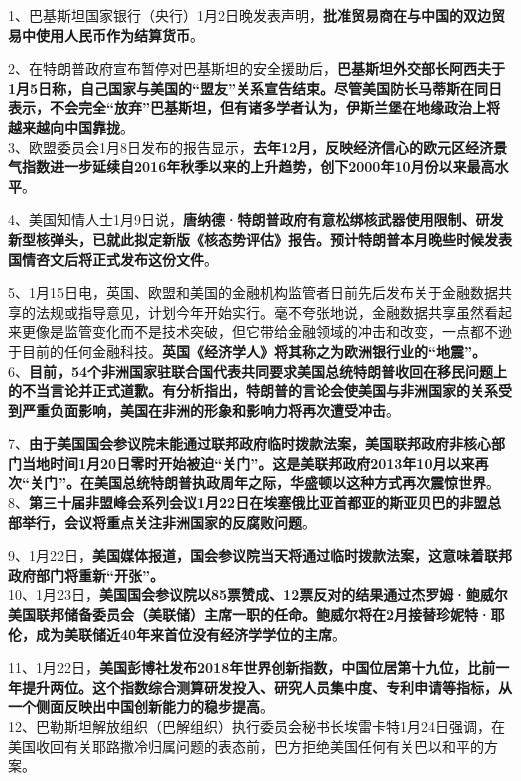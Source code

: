 1、巴基斯坦国家银行（央行）1月2日晚发表声明，{\textbf{批准贸易商在与中国的双边贸易中使用人民币作为结算货币}}。

2、在特朗普政府宣布暂停对巴基斯坦的安全援助后，{\textbf{巴基斯坦外交部长阿西夫于1月5日称，自己国家与美国的``盟友''关系宣告结束。尽管美国防长马蒂斯在同日表示，不会完全``放弃''巴基斯坦，但有诸多学者认为，伊斯兰堡在地缘政治上将越来越向中国靠拢}}。\\
3、欧盟委员会1月8日发布的报告显示，{\textbf{去年12月，反映经济信心的欧元区经济景气指数进一步延续自2016年秋季以来的上升趋势，创下2000年10月份以来最高水平}}。

4、美国知情人士1月9日说，{\textbf{唐纳德·特朗普政府有意松绑核武器使用限制、研发新型核弹头，已就此拟定新版《核态势评估》报告。预计特朗普本月晚些时候发表国情咨文后将正式发布这份文件}}。

5、1月15日电，英国、欧盟和美国的金融机构监管者日前先后发布关于金融数据共享的法规或指导意见，计划今年开始实行。毫不夸张地说，金融数据共享虽然看起来更像是监管变化而不是技术突破，但它带给金融领域的冲击和改变，一点都不逊于目前的任何金融科技。{\textbf{英国《经济学人》将其称之为欧洲银行业的``地震''。}}\\
6、{\textbf{目前，54个非洲国家驻联合国代表共同要求美国总统特朗普收回在移民问题上的不当言论并正式道歉。有分析指出，特朗普的言论会使美国与非洲国家的关系受到严重负面影响，美国在非洲的形象和影响力将再次遭受冲击}}。

7、{\textbf{由于美国国会参议院未能通过联邦政府临时拨款法案，美国联邦政府非核心部门当地时间1月20日零时开始被迫``关门''。这是美联邦政府2013年10月以来再次``关门''。在美国总统特朗普执政周年之际，华盛顿以这种方式再次震惊世界}}。\\
8、{\textbf{第三十届非盟峰会系列会议1月22日在埃塞俄比亚首都亚的斯亚贝巴的非盟总部举行，会议将重点关注非洲国家的反腐败问题}}。

9、1月22日，{\textbf{美国媒体报道，国会参议院当天将通过临时拨款法案，这意味着联邦政府部门将重新``开张''。}}\\
10、1月23日，{\textbf{美国国会参议院以85票赞成、12票反对的结果通过杰罗姆·鲍威尔美国联邦储备委员会（美联储）主席一职的任命。鲍威尔将在2月接替珍妮特·耶伦，成为美联储近40年来首位没有经济学学位的主席}}。

11、1月22日，{\textbf{美国彭博社发布2018年世界创新指数，中国位居第十九位，比前一年提升两位。这个指数综合测算研发投入、研究人员集中度、专利申请等指标，从一个侧面反映出中国创新能力的稳步提高}}。\\
12、巴勒斯坦解放组织（巴解组织）执行委员会秘书长埃雷卡特1月24日强调，在美国收回有关耶路撒冷归属问题的表态前，巴方拒绝美国任何有关巴以和平的方案。

